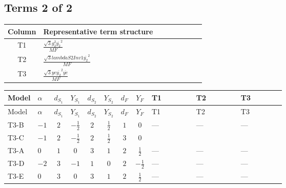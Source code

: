 \documentclass[8pt]{article}
\begin{document}
\begin{landscape}
\subsection*{Terms 2 of 2}
\begin{center}
\begin{tabular}{@{}c >{\raggedright\arraybackslash}p{0.82\linewidth}@{}}
\toprule
Column & Representative term structure \\
\midrule
T1 & \(\displaystyle \frac{\sqrt{3} g_{2}^{2} \overline{y_{2}}^{2}}{MF}\) \\
\midrule
T2 & \(\displaystyle \frac{\sqrt{3} lambdaS2Inv1 \overline{y_{2}}^{2}}{MF}\) \\
\midrule
T3 & \(\displaystyle \frac{\sqrt{3} ye \overline{y_{2}}^{2} \overline{ye}}{MF}\) \\
\midrule
\bottomrule
\end{tabular}
\end{center}
\smallskip
\tiny
\begin{longtable}{@{}llcccccc >{\raggedright\arraybackslash}p{0.21\linewidth} >{\raggedright\arraybackslash}p{0.21\linewidth} >{\raggedright\arraybackslash}p{0.21\linewidth}@{}}
\toprule
Model & $\alpha$ & $d_{S_1}$ & $Y_{S_1}$ & $d_{S_2}$ & $Y_{S_2}$ & $d_F$ & $Y_F$ & T1 & T2 & T3 \\
\midrule
\endfirsthead
\toprule
Model & $\alpha$ & $d_{S_1}$ & $Y_{S_1}$ & $d_{S_2}$ & $Y_{S_2}$ & $d_F$ & $Y_F$ & T1 & T2 & T3 \\
\midrule
\endhead
T3-B & $-1$ & $2$ & $-\frac{1}{2}$ & $2$ & $\frac{1}{2}$ & $1$ & $0$ & --- & --- & --- \\
\midrule
T3-C & $-1$ & $2$ & $-\frac{1}{2}$ & $2$ & $\frac{1}{2}$ & $3$ & $0$ & \scriptsize\adjustbox{max width=\linewidth}{$\begin{gathered} - \frac{\sqrt{3} g_{2}^{2} \overline{y_{2}}^{2}}{4 MF}\end{gathered}$} & \scriptsize\adjustbox{max width=\linewidth}{$\begin{gathered} - \frac{\sqrt{3} lambdaS2Inv1 \overline{y_{2}}^{2}}{6 MF}\end{gathered}$} & \scriptsize\adjustbox{max width=\linewidth}{$\begin{gathered} \frac{\sqrt{3} ye \overline{y_{2}}^{2} \overline{ye}}{12 MF}\end{gathered}$} \\
\midrule
T3-A & $0$ & $1$ & $0$ & $3$ & $1$ & $2$ & $\frac{1}{2}$ & --- & --- & --- \\
\midrule
T3-D & $-2$ & $3$ & $-1$ & $1$ & $0$ & $2$ & $-\frac{1}{2}$ & --- & --- & --- \\
\midrule
T3-E & $0$ & $3$ & $0$ & $3$ & $1$ & $2$ & $\frac{1}{2}$ & --- & --- & --- \\
\midrule
\bottomrule
\end{longtable}
\clearpage

\end{landscape}
\end{document}
